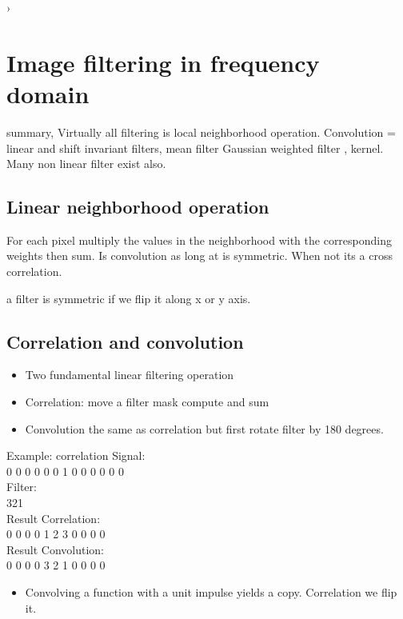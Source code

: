 ›

\section{Image filtering in frequency domain}

summary, Virtually all filtering is local neighborhood operation.
Convolution = linear and shift invariant filters, mean filter Gaussian weighted filter , kernel. 
Many non linear filter exist also. 

\subsection*{Linear neighborhood operation}
For each pixel multiply the values in the neighborhood with the corresponding weights then sum. Is convolution as long at is symmetric. When not its a cross correlation. 

a filter is symmetric if we flip it along x or y axis. 

\subsection*{Correlation and convolution}
 \begin{itemize}
 	\item Two fundamental linear filtering operation
 	\item Correlation: move a filter mask compute and sum
 	\item  Convolution the same as correlation but first rotate filter by 180 degrees.  
 \end{itemize}
 
 \begin{example}{Example: correlation}
 Signal: \\
 0 0 0 0 0 0 1 0 0 0 0 0 0 \\
 Filter: \\
 321 \\
 Result Correlation: \\
 0 0 0 0 1 2 3 0 0 0 0 \\
 Result Convolution: \\
 0 0 0 0 3 2 1 0 0 0 0 \\
 \begin{itemize}
 	\item Convolving a function with a unit impulse yields a copy. Correlation we flip it. 
 \end{itemize}
 
 \end{example}	



